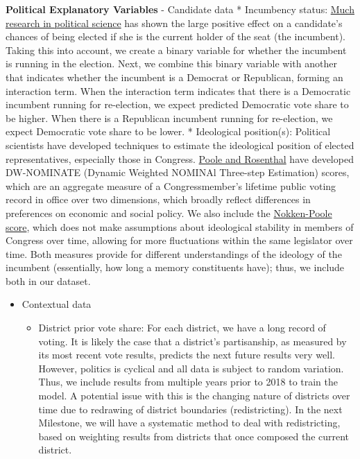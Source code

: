 \documentclass[11pt]{article}
\providecommand{\tightlist}{%
      \setlength{\itemsep}{0pt}\setlength{\parskip}{0pt}}
\begin{document}
\textbf{Political Explanatory Variables} - Candidate data * Incumbency
status: \href{https://www.jstor.org/stable/2111475}{Much research in
political science} has shown the large positive effect on a candidate's
chances of being elected if she is the current holder of the seat (the
incumbent). Taking this into account, we create a binary variable for
whether the incumbent is running in the election. Next, we combine this
binary variable with another that indicates whether the incumbent is a
Democrat or Republican, forming an interaction term. When the
interaction term indicates that there is a Democratic incumbent running
for re-election, we expect predicted Democratic vote share to be higher.
When there is a Republican incumbent running for re-election, we expect
Democratic vote share to be lower. * Ideological position(s): Political
scientists have developed techniques to estimate the ideological
position of elected representatives, especially those in Congress.
\href{https://voteview.com/about}{Poole and Rosenthal} have developed
DW-NOMINATE (Dynamic Weighted NOMINAl Three-step Estimation) scores,
which are an aggregate measure of a Congressmember's lifetime public
voting record in office over two dimensions, which broadly reflect
differences in preferences on economic and social policy. We also
include the
\href{https://onlinelibrary.wiley.com/doi/abs/10.3162/036298004X201294}{Nokken-Poole
score}, which does not make assumptions about ideological stability in
members of Congress over time, allowing for more fluctuations within the
same legislator over time. Both measures provide for different
understandings of the ideology of the incumbent (essentially, how long a
memory constituents have); thus, we include both in our dataset.

\begin{itemize}
\tightlist
\item
  Contextual data

  \begin{itemize}
  \tightlist
  \item
    District prior vote share: For each district, we have a long record
    of voting. It is likely the case that a district's partisanship, as
    measured by its most recent vote results, predicts the next future
    results very well. However, politics is cyclical and all data is
    subject to random variation. Thus, we include results from multiple
    years prior to 2018 to train the model. A potential issue with this
    is the changing nature of districts over time due to redrawing of
    district boundaries (redistricting). In the next Milestone, we will
    have a systematic method to deal with redistricting, based on
    weighting results from districts that once composed the current
    district.
  \end{itemize}
\end{itemize}
\end{document}
